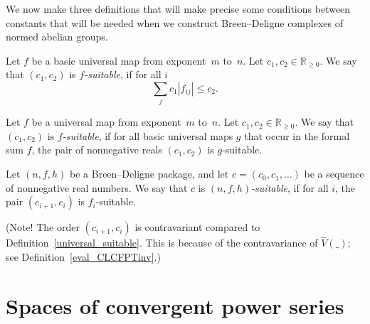 We now make three definitions that will make precise
some conditions between constants that will be needed
when we construct Breen--Deligne complexes of normed abelian groups.

\begin{definition}
  \label{basic_suitable}
  \leanok
  Let $f$ be a basic universal map from exponent~$m$ to~$n$.
  Let $c_1, c_2 \in \mathbb R_{\ge 0}$.
  We say that $(c_1, c_2)$ is \emph{$f$-suitable}, if for all $i$
  \[
    \sum_j c_1|f_{ij}| \le c_2.
  \]
\end{definition}

\begin{definition}
  \label{universal_suitable}
  \leanok
  Let $f$ be a universal map from exponent~$m$ to~$n$.
  Let $c_1, c_2 \in \mathbb R_{\ge 0}$.
  We say that $(c_1, c_2)$ is \emph{$f$-suitable}, if for all basic universal maps $g$
  that occur in the formal sum $f$,
  the pair of nonnegative reals $(c_1, c_2)$ is $g$-suitable.
\end{definition}

\begin{definition}
  \label{BD_suitable}
  \leanok
  Let $(n, f, h)$ be a Breen--Deligne package,
  and let $c = (c_0, c_1, \dots)$ be a sequence of nonnegative real numbers.
  We say that $c$ is \emph{$(n,f,h)$-suitable},
  if for all $i$, the pair $(c_{i+1}, c_i)$ is $f_i$-suitable.

  (Note! The order $(c_{i+1}, c_i)$ is contravariant
  compared to Definition~\ref{universal_suitable}.
  This is because of the contravariance of $\hat V(\_)$;
  see Definition~\ref{eval_CLCFPTinv}.)
\end{definition}

\section{Spaces of convergent power series}

